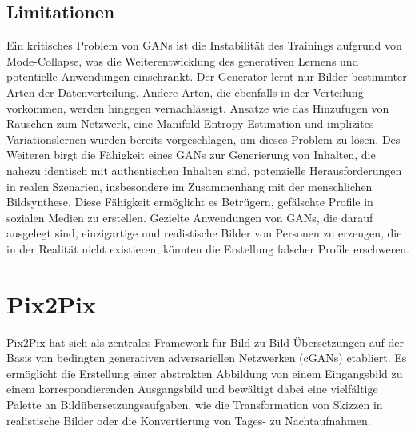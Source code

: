 \subsection{Limitationen}
Ein kritisches Problem von GANs ist die Instabilität des Trainings aufgrund von Mode-Collapse, was die Weiterentwicklung des generativen Lernens und potentielle Anwendungen einschränkt\cite{Liu.2022}. Der Generator lernt nur Bilder bestimmter Arten der Datenverteilung.  Andere Arten, die ebenfalls in der Verteilung vorkommen, werden hingegen vernachlässigt\cite{Srivastava.2017}. Ansätze wie das Hinzufügen von Rauschen zum Netzwerk, eine Manifold Entropy Estimation \cite{Liu.2022} und implizites Variationslernen \cite{Srivastava.2017} wurden bereits vorgeschlagen, um dieses Problem zu lösen.
Des Weiteren birgt die Fähigkeit eines GANs zur Generierung von Inhalten, die nahezu identisch mit authentischen Inhalten sind, potenzielle Herausforderungen in realen Szenarien, insbesondere im Zusammenhang mit der menschlichen Bildsynthese. Diese Fähigkeit ermöglicht es Betrügern, gefälschte Profile in sozialen Medien zu erstellen. Gezielte Anwendungen von GANs, die darauf ausgelegt sind, einzigartige und realistische Bilder von Personen zu erzeugen, die in der Realität nicht existieren, könnten die Erstellung falscher Profile erschweren\cite{Aggarwal.2021}.


\section{Pix2Pix}
Pix2Pix hat sich als zentrales Framework für Bild-zu-Bild-Übersetzungen auf der Basis von bedingten generativen adversariellen Netzwerken (cGANs) etabliert. Es ermöglicht die Erstellung einer abstrakten Abbildung von einem Eingangsbild zu einem korrespondierenden Ausgangsbild und bewältigt dabei eine vielfältige Palette an Bildübersetzungsaufgaben, wie die Transformation von Skizzen in realistische Bilder oder die Konvertierung von Tages- zu Nachtaufnahmen.
  



